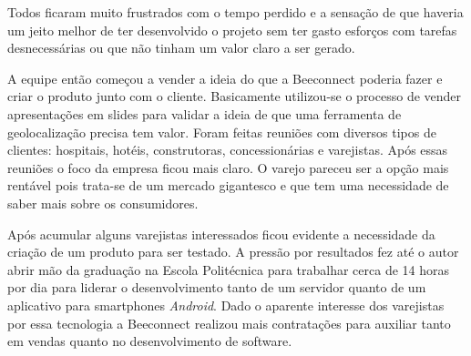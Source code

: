Todos ficaram muito frustrados com o tempo perdido e a sensação de que haveria um jeito melhor de ter desenvolvido o projeto sem ter gasto esforços com tarefas desnecessárias ou que não tinham um valor claro a ser gerado.

A equipe então começou a vender a ideia do que a Beeconnect poderia fazer e criar o produto junto com o cliente. Basicamente utilizou-se o processo de vender apresentações em slides para validar a ideia de que uma ferramenta de geolocalização precisa tem valor. Foram feitas reuniões com diversos tipos de clientes: hospitais, hotéis, construtoras, concessionárias e varejistas. Após essas reuniões o foco da empresa ficou mais claro. O varejo pareceu ser a opção mais rentável pois trata-se de um mercado gigantesco e que tem uma necessidade de saber mais sobre os consumidores.

Após acumular alguns varejistas interessados ficou evidente a necessidade da criação de um produto para ser testado. A pressão por resultados fez até o autor abrir mão da graduação na Escola Politécnica para trabalhar cerca de 14 horas por dia para liderar o desenvolvimento tanto de um servidor quanto de um aplicativo para smartphones \textit{Android}. Dado o aparente interesse dos varejistas por essa tecnologia a Beeconnect realizou mais contratações para auxiliar tanto em vendas quanto no desenvolvimento de software.


